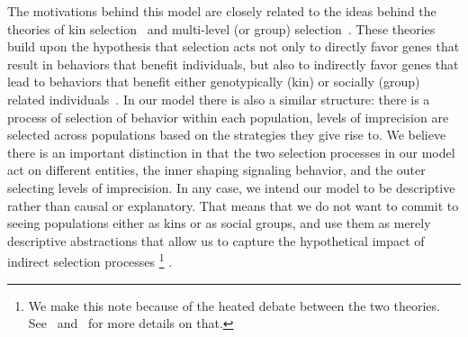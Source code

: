 \documentclass[a4paper]{article}
\begin{document}
The motivations behind this model are closely related to the ideas behind the theories of kin selection~\parencite{hamilton_genetical_1964} and multi-level (or group) selection~\parencite{wilson_theory_1975}.
These theories build upon the hypothesis that selection acts not only to directly favor genes that result in behaviors that benefit individuals, but also to indirectly favor genes that lead to behaviors that benefit either genotypically (kin) or socially (group) related individuals~\parencite[see][for more details]{okasha_evolution_2006}.
In our model there is also a similar structure: there is a process of selection of behavior within each population, levels of imprecision are selected across populations based on the strategies they give rise to.
We believe there is an important distinction in that the two selection processes in our model act on different entities, the inner shaping signaling behavior, and the outer selecting levels of imprecision.
In any case, we intend our model to be descriptive rather than causal or explanatory.
That means that we do not want to commit to seeing populations either as kins or as social groups, and use them as merely descriptive abstractions that allow us to capture the hypothetical impact of indirect selection processes%
\footnote{We make this note because of the heated debate between the two theories. See~\textcite{kohn_darwin_2008} and~\textcite{kramer_kin_2016} for more details on that.}%
.
\end{document}
